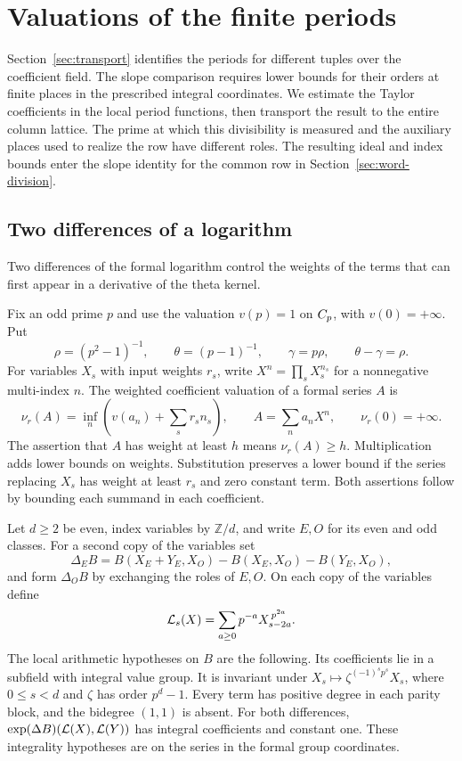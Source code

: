 \section{Valuations of the finite periods}\label{sec:finite-valuations}
\hypertarget{source-finite-valuations}{}

Section~\ref{sec:transport} identifies the periods for different tuples over the coefficient field. The slope comparison requires lower bounds for their orders at finite places in the prescribed integral coordinates. We estimate the Taylor
coefficients in the local period functions, then transport the
result to the entire column lattice. The prime at which this
divisibility is measured and the auxiliary places used to
realize the row have different roles. The resulting ideal and
index bounds enter the slope identity for the common row in
Section~\ref{sec:word-division}.

\subsection{Two differences of a logarithm}

Two differences of the formal logarithm control the weights of the terms that can first appear in a derivative of the theta kernel.

Fix an odd prime \(p\) and use the valuation \(v(p)=1\) on
\(C_p\), with \(v(0)=+\infty\). Put
\[
 \rho=(p^2-1)^{-1},\qquad \theta=(p-1)^{-1},\qquad
 \gamma=p\rho,\qquad \theta-\gamma=\rho .
\]
For variables \(X_s\) with input weights \(r_s\), write \(X^n=\prod_s X_s^{n_s}\) for a nonnegative multi-index \(n\). The weighted coefficient valuation of a formal series \(A\) is
\begin{equation}\label{eq:finite-weighted-coefficient-valuation}
 \nu_r(A)=\inf_n\left(v(a_n)+\sum_s r_s n_s\right),
 \qquad A=\sum_n a_n X^n,\qquad \nu_r(0)=+\infty .
\end{equation}
The assertion that \(A\) has weight at least \(h\) means
\(\nu_r(A)\ge h\). Multiplication adds lower bounds on weights. Substitution
preserves a lower bound if the series replacing \(X_s\) has
weight at least \(r_s\) and zero constant term. Both assertions
follow by bounding each summand in each coefficient.

Let \(d\ge2\) be even, index variables by \(\mathbb Z/d\), and
write \(E,O\) for its even and odd classes. For a second copy
of the variables set
\[
 \Delta_E B=B(X_E+Y_E,X_O)-B(X_E,X_O)-B(Y_E,X_O),
\]
and form \(\Delta_O B\) by exchanging the roles of \(E,O\).
On each copy of the variables define
\[
 {\cal L}_s(X)=\sum_{a\ge0}p^{-a}X_{s-2a}^{\,p^{2a}} .
\]
The local arithmetic hypotheses on \(B\) are the following.
Its coefficients lie in a subfield with integral value group.
It is invariant under \(X_s\mapsto\zeta^{(-1)^s p^s}X_s\),
where \(0\le s<d\) and \(\zeta\) has order \(p^d-1\).
Every term has positive degree in each parity block, and the
bidegree \((1,1)\) is absent. For both differences,
\(\exp(\Delta B)({\cal L}(X),{\cal L}(Y))\) has integral
coefficients and constant one. These integrality hypotheses
are on the series in the formal group coordinates.

